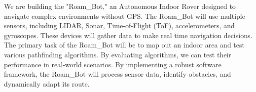 We are building the "Roam\_Bot," an Autonomous Indoor Rover designed to navigate complex environments without GPS. The Roam\_Bot will use multiple sensors, including LIDAR, Sonar, Time-of-Flight (ToF), accelerometers, and gyroscopes. These devices will gather data to make real time navigation decisions. The primary task of the Roam\_Bot will be to map out an indoor area and test various pathfinding algorithms. By evaluating algorithms, we can test their performance in real-world scenarios. By implementing a robust software framework, the Roam\_Bot will process sensor data, identify obstacles, and dynamically adapt its route.


